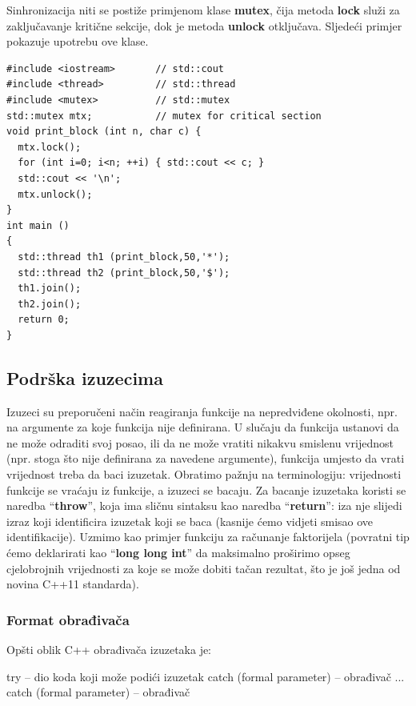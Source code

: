 \documentclass[11pt]{book}
\begin{document}
Sinhronizacija niti se postiže primjenom klase \textbf{mutex}, čija metoda \textbf{lock} služi za zaključavanje kritične sekcije, dok je metoda \textbf{unlock} otključava. Sljedeći primjer pokazuje upotrebu ove klase.

\begin{lstlisting}
#include <iostream>       // std::cout
#include <thread>         // std::thread
#include <mutex>          // std::mutex
std::mutex mtx;           // mutex for critical section
void print_block (int n, char c) {
  mtx.lock();
  for (int i=0; i<n; ++i) { std::cout << c; }
  std::cout << '\n';
  mtx.unlock();
}
int main ()
{
  std::thread th1 (print_block,50,'*');
  std::thread th2 (print_block,50,'$');
  th1.join();
  th2.join();
  return 0;
}
\end{lstlisting}

\subsection{Podrška izuzecima}
Izuzeci su preporučeni način reagiranja funkcije na nepredviđene okolnosti, npr. na argumente za koje funkcija nije definirana. U slučaju da funkcija ustanovi da ne može odraditi svoj posao, ili da ne može vratiti nikakvu smislenu vrijednost (npr. stoga što nije definirana za navedene argumente), funkcija umjesto da vrati vrijednost treba da baci izuzetak. Obratimo pažnju na terminologiju: vrijednosti funkcije se vraćaju iz funkcije, a izuzeci se bacaju. Za bacanje izuzetaka koristi se naredba “\textbf{throw}”, koja ima sličnu sintaksu kao naredba “\textbf{return}”: iza nje slijedi izraz koji identificira izuzetak koji se baca (kasnije ćemo vidjeti smisao ove identifikacije). Uzmimo kao primjer funkciju za računanje faktorijela (povratni tip ćemo deklarirati kao “\textbf{long long int}” da maksimalno proširimo opseg cjelobrojnih vrijednosti za koje se može dobiti tačan rezultat, što je još jedna od novina C++11 standarda).

\subsubsection{Format obrađivača}
Opšti oblik C++ obrađivača izuzetaka je:

\begin{shortlisting}
  try {
      -- dio koda koji može podići izuzetak
    }
  catch (formal parameter) {
      -- obrađivač
    }
  ...
  catch (formal parameter) { -- obrađivač
    }
\end{shortlisting}
\end{document}
